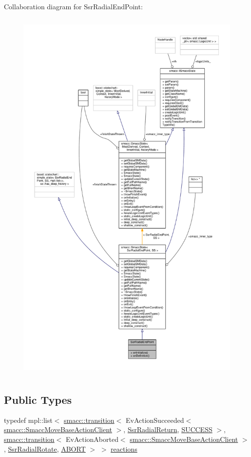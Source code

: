 Collaboration diagram for Ssr\+Radial\+End\+Point\+:
\nopagebreak
\begin{figure}[H]
\begin{center}
\leavevmode
\includegraphics[height=550pt]{structSsrRadialEndPoint__coll__graph}
\end{center}
\end{figure}
\subsection*{Public Types}
\begin{DoxyCompactItemize}
\item 
typedef mpl\+::list$<$ \hyperlink{classsmacc_1_1transition}{smacc\+::transition}$<$ Ev\+Action\+Succeeded$<$ \hyperlink{classsmacc_1_1SmaccMoveBaseActionClient}{smacc\+::\+Smacc\+Move\+Base\+Action\+Client} $>$, \hyperlink{structSsrRadialReturn}{Ssr\+Radial\+Return}, \hyperlink{classSUCCESS}{S\+U\+C\+C\+E\+SS} $>$, \hyperlink{classsmacc_1_1transition}{smacc\+::transition}$<$ Ev\+Action\+Aborted$<$ \hyperlink{classsmacc_1_1SmaccMoveBaseActionClient}{smacc\+::\+Smacc\+Move\+Base\+Action\+Client} $>$, \hyperlink{structSsrRadialRotate}{Ssr\+Radial\+Rotate}, \hyperlink{classABORT}{A\+B\+O\+RT} $>$ $>$ \hyperlink{structSsrRadialEndPoint_abf6a36586cc82daa3bdb476bba2f8772}{reactions}
\end{DoxyCompactItemize}

